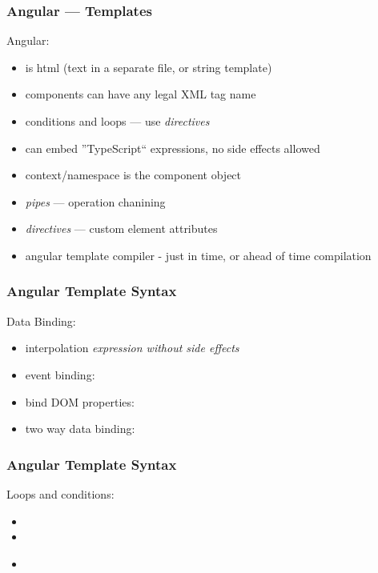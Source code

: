 \begin{frame}[fragile] \frametitle{Angular --- Templates}
Angular:
\begin{itemize}
  \item is html (text in a separate file, or string template)
  \item components can have any legal XML tag name
  \item conditions and loops --- use \emph{directives}
  \item can embed ''TypeScript`` expressions, no side effects allowed
  \item context/namespace is the component object
  \item \emph{pipes} --- operation chanining
  \item \emph{directives} --- custom element attributes
  \item angular template compiler - just in time, or ahead of time compilation
\end{itemize}
\end{frame}

\begin{frame}[fragile] \frametitle{Angular Template Syntax}
Data Binding:
\begin{itemize}
  \item interpolation  \emph{expression without side effects} 
  \item event binding: 
  \item bind DOM properties: 
  \item two way data binding: 
\end{itemize}
\end{frame}

\begin{frame}[fragile] \frametitle{Angular Template Syntax}
Loops and conditions:
\begin{itemize}
  \item {}
  \item {}
  \item {}\\
   \hspace{3mm} \\
   \hspace{3mm} 
\end{itemize}
\end{frame}

